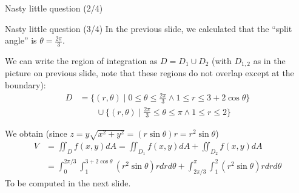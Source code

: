 \begin{frame}{Nasty little question (2/4)}
\begin{minipage}{0.45\textwidth}
            \end{minipage}
\end{frame}




\begin{frame}{Nasty little question (3/4)}
    \footnotesize
                In the previous slide, we calculated that the ``split angle'' is $\theta=\frac{2\pi}{3}$.  

            We can write the region of integration as $D=D_1\cup D_2$ (with $D_{1,2}$ as in the picture on previous slide, note that these regions do not overlap except at the boundary):
            \begin{align*}D &=\{(r,\theta) \mid 0\leq\theta\leq\frac{2\pi}{3} \land 1\leq r\leq 3+2\cos\theta \}\\&\qquad\cup\{(r,\theta) \mid \frac{2\pi}{3}\leq\theta\leq\pi \land 1\leq r\leq2\}\end{align*}

            We obtain (since $z=y\sqrt{x^2+y^2}=(r\sin\theta)r=r^2\sin\theta$) \begin{align*}V&=\iint_{D}f(x,y)dA=\iint_{D_1}f(x,y)dA+\iint_{D_2}f(x,y)dA\\&=\int_0^{2\pi/3}\int_1^{3+2\cos\theta}(r^2\sin\theta)rdrd\theta+\int_{2\pi/3}^{\pi}\int_{1}^2(r^2\sin\theta) rdrd\theta\end{align*}
            To be computed in the next slide.

\end{frame}

